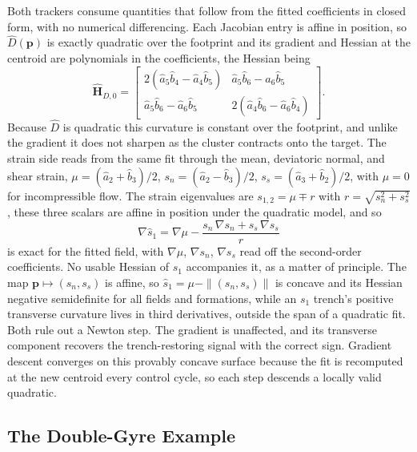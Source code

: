 \documentclass[lettersize,journal]{IEEEtran}
\begin{document}
Both trackers consume quantities that follow from the fitted
coefficients in closed form, with no numerical differencing. Each
Jacobian entry is affine in position, so $\hat{D}(\mathbf{p})$ is
exactly quadratic over the footprint and its gradient and Hessian at the
centroid are polynomials in the coefficients, the Hessian being
\begin{equation}
    \hat{\mathbf{H}}_{D,0} =
    \begin{bmatrix}
        2(\hat{a}_5 \hat{b}_4 - \hat{a}_4 \hat{b}_5) &
        \hat{a}_5 \hat{b}_6 - \hat{a}_6 \hat{b}_5 \\
        \hat{a}_5 \hat{b}_6 - \hat{a}_6 \hat{b}_5 &
        2(\hat{a}_4 \hat{b}_6 - \hat{a}_6 \hat{b}_4)
    \end{bmatrix}.
    \label{eq:hess_det}
\end{equation}
Because $\hat{D}$ is quadratic this curvature is constant over the
footprint, and unlike the gradient it does not sharpen as the cluster
contracts onto the target. The strain side reads from the same fit
through the mean, deviatoric normal, and shear strain, $\mu =
(\hat{a}_2 + \hat{b}_3)/2$, $s_n = (\hat{a}_2 - \hat{b}_3)/2$, $s_s =
(\hat{a}_3 + \hat{b}_2)/2$, with $\mu = 0$ for incompressible flow.
The strain eigenvalues are $s_{1,2} = \mu \mp r$ with $r = \sqrt{s_n^2
+ s_s^2}$, these three scalars are affine in position under the
quadratic model, and so
\begin{equation}
    \nabla \hat{s}_1 = \nabla\mu
    - \frac{s_n\,\nabla s_n + s_s\,\nabla s_s}{r}
    \label{eq:grad_s1}
\end{equation}
is exact for the fitted field, with $\nabla\mu$, $\nabla s_n$, $\nabla
s_s$ read off the second-order coefficients. No usable Hessian of $s_1$
accompanies it, as a matter of principle. The map
$\mathbf{p} \mapsto (s_n, s_s)$ is affine, so $\hat{s}_1 = \mu -
\|(s_n, s_s)\|$ is concave and its Hessian negative semidefinite for
all fields and formations, while an $s_1$ trench's positive transverse
curvature lives in third derivatives, outside the span of a quadratic
fit. Both rule out a Newton
step. The gradient is unaffected, and its transverse
component recovers the trench-restoring signal with the correct sign.
Gradient descent converges on this provably concave surface because the
fit is recomputed at the new centroid every control cycle, so each step
descends a locally valid quadratic.

\subsection{The Double-Gyre Example}
\label{sec:dg_example}
\end{document}
